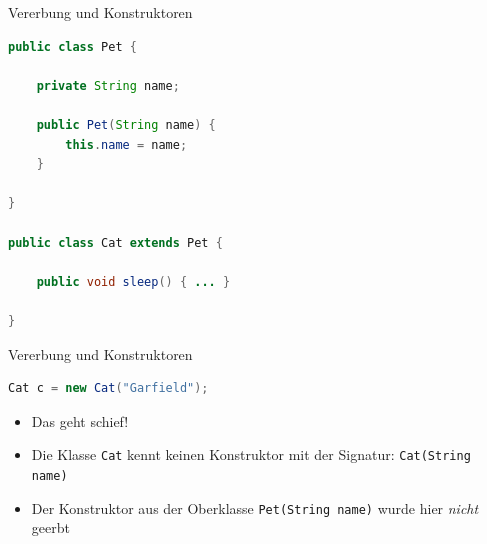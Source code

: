 \documentclass[18pt]{beamer}
\begin{document}
\begin{frame}[fragile]{Vererbung und Konstruktoren}
    \begin{exampleblock}{}
        \begin{lstlisting}[language=Java,basicstyle=\scriptsize]
public class Pet {

    private String name;

    public Pet(String name) {
        this.name = name;
    }

}

public class Cat extends Pet {

    public void sleep() { ... }

}
        \end{lstlisting}

    \end{exampleblock}
\end{frame}

\begin{frame}[fragile]{Vererbung und Konstruktoren}
    \begin{exampleblock}{}
        \begin{lstlisting}[language=Java,basicstyle=\scriptsize]
Cat c = new Cat("Garfield");
        \end{lstlisting}

    \end{exampleblock}

    \begin{itemize}
        \item Das geht schief!
        \item Die Klasse \texttt{Cat} kennt keinen Konstruktor mit der Signatur: \texttt{Cat(String name)}
        \item Der Konstruktor aus der Oberklasse \texttt{Pet(String name)} wurde hier \textit{nicht} geerbt
    \end{itemize}
\end{frame}
\end{document}
